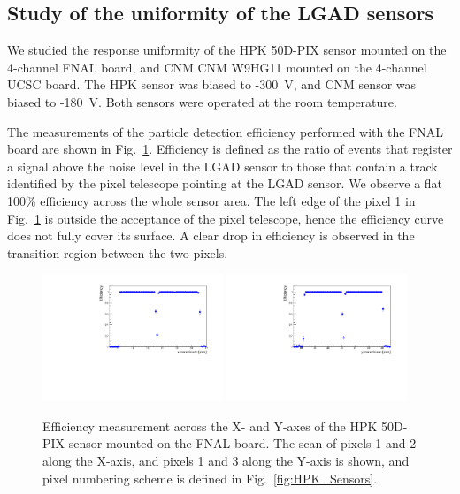 \documentclass[preprint,1p]{elsarticle}
\begin{document}
\subsection{Study of the uniformity of the LGAD sensors}
\label{sec:HPK_CNM_uniformity}

We studied the response uniformity of the HPK 50D-PIX sensor mounted on the
4-channel FNAL board, and CNM CNM W9HG11 mounted on the 4-channel UCSC board.
The HPK sensor was biased to -300~V, and CNM sensor was biased to -180~V. Both
sensors were operated at the room temperature.

The measurements of the particle detection efficiency performed with the FNAL
board are shown in Fig.~\ref{fig:FNAL_HPK50_effXY}. Efficiency is defined as the
ratio of events that register a signal above the noise level in the LGAD sensor
to those that contain a track identified by the pixel telescope pointing at the
LGAD sensor. We observe a flat 100\% efficiency across the whole sensor area.
The left edge of the pixel 1 in Fig.~\ref{fig:FNAL_HPK50_effXY} is outside the
acceptance of the pixel telescope, hence the efficiency curve does not fully
cover its surface. A clear drop in efficiency is observed in the transition
region between the two pixels. 

\begin{figure}[htbp] 
\centering
\includegraphics[width=0.48\textwidth]{figs/FNALBoard_HPK50DPix_Run847-891/Eff_vs_X_Ch4_5.pdf} 
\includegraphics[width=0.48\textwidth]{figs/FNALBoard_HPK50DPix_Run847-891/Eff_vs_Y_Ch3_4.pdf} 
\caption{Efficiency measurement across the X- and Y-axes of the HPK 50D-PIX sensor mounted on the FNAL board. The scan of pixels 1 and 2 along the X-axis, and pixels 1 and 3 along the Y-axis is shown, and pixel numbering scheme is defined in Fig.~\ref{fig:HPK_Sensors}.} 
\label{fig:FNAL_HPK50_effXY} 
\end{figure} 
\end{document}
